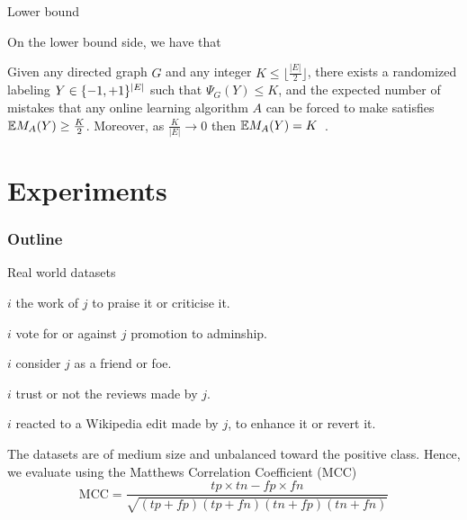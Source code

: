\documentclass[10pt,svgnames,ignorenonframetext,final]{beamer}
\providecommand{\tightlist}{%
  \setlength{\itemsep}{0pt}\setlength{\parskip}{0pt}}
\begin{document}
\begin{frame}{Lower bound}

On the lower bound side, we have that

\begin{theorem}
Given any directed graph $G$ and any integer $K \le \big\lfloor \tfrac{|E|}{2}\big\rfloor$, there
exists a randomized labeling $Y\in\{-1,+1\}^{|E|}$ such that $\Psi_G(Y) \leq K$, and the expected number
of mistakes that any online learning algorithm $A$ can be forced to make satisfies
$\mathbb{E} M_A(Y) \geq \frac{K}{2}$.
Moreover, as $\frac{K}{|E|} \rightarrow 0$ then $\mathbb{E} M_A(Y) = K$~.
\end{theorem}

\end{frame}


\section{Experiments}\label{experiments}
  \begin{frame} \frametitle{Outline} \tableofcontents[currentsection] \end{frame}

\begin{frame}{Real world datasets}

\begin{description}
  \tightlist
\item[\aut{}]
\(i\) the work of \(j\) to praise it or criticise it.

\item[\wik{}]
\(i\) vote for or against \(j\) promotion to adminship.

\item[\sla{}]
\(i\) consider \(j\) as a friend or foe.

\item[\epi{}]
\(i\) trust or not the reviews made by \(j\).

\item[\kiw{}]
\(i\) reacted to a Wikipedia edit made by \(j\), to enhance it or revert it.

\end{description}

The datasets are of medium size and unbalanced toward the positive class.
Hence, we evaluate using the Matthews Correlation Coefficient (MCC)
\[\mathrm{MCC} = \frac{tp\times tn-fp\times fn} {\sqrt{ (tp + fp) ( tp + fn ) ( tn + fp ) ( tn + fn ) } }\]

\end{frame}
\end{document}
